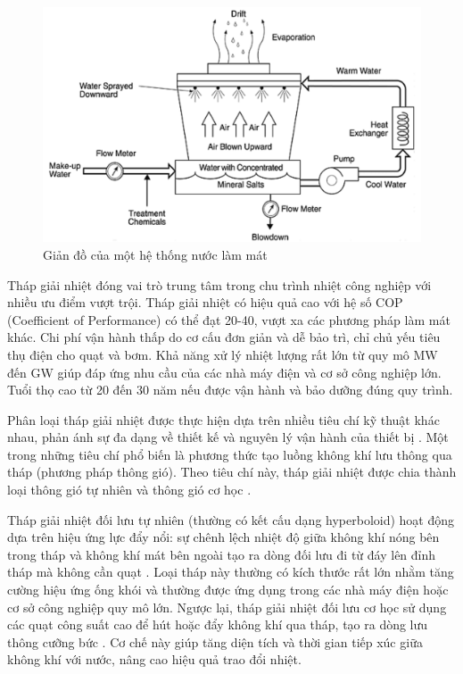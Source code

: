\documentclass[../main.tex]{subfiles}
\begin{document}
\begin{figure}[H]
    \centering
    \includegraphics[width=1\textwidth]{Hinhve/gian_do_lam_mat.png}
    \caption{Giản đồ của một hệ thống nước làm mát \cite{unep2006coolingtower_en}}
    \label{fig:gian_do_lam_mat}
\end{figure}

Tháp giải nhiệt đóng vai trò trung tâm trong chu trình nhiệt công nghiệp \cite{ashrae2020cooling} với nhiều ưu điểm vượt trội. Tháp giải nhiệt có hiệu quả cao với hệ số COP (Coefficient of Performance) có thể đạt 20-40, vượt xa các phương pháp làm mát khác. Chi phí vận hành thấp do cơ cấu đơn giản và dễ bảo trì, chỉ chủ yếu tiêu thụ điện cho quạt và bơm. Khả năng xử lý nhiệt lượng rất lớn từ quy mô MW đến GW giúp đáp ứng nhu cầu của các nhà máy điện và cơ sở công nghiệp lớn. Tuổi thọ cao từ 20 đến 30 năm nếu được vận hành và bảo dưỡng đúng quy trình.

Phân loại tháp giải nhiệt được thực hiện dựa trên nhiều tiêu chí kỹ thuật khác nhau, phản ánh sự đa dạng về thiết kế và nguyên lý vận hành của thiết bị \cite{cti_cooling_towers_2011}. Một trong những tiêu chí phổ biến là phương thức tạo luồng không khí lưu thông qua tháp (phương pháp thông gió). Theo tiêu chí này, tháp giải nhiệt được chia thành loại thông gió tự nhiên và thông gió cơ học \cite{cti_cooling_towers_2011}.

Tháp giải nhiệt đối lưu tự nhiên (thường có kết cấu dạng hyperboloid) hoạt động dựa trên hiệu ứng lực đẩy nổi: sự chênh lệch nhiệt độ giữa không khí nóng bên trong tháp và không khí mát bên ngoài tạo ra dòng đối lưu đi từ đáy lên đỉnh tháp mà không cần quạt \cite{patterson_natural_draft_cooling_2013}. Loại tháp này thường có kích thước rất lớn nhằm tăng cường hiệu ứng ống khói và thường được ứng dụng trong các nhà máy điện hoặc cơ sở công nghiệp quy mô lớn. Ngược lại, tháp giải nhiệt đối lưu cơ học sử dụng các quạt công suất cao để hút hoặc đẩy không khí qua tháp, tạo ra dòng lưu thông cưỡng bức \cite{johnson_mechanical_draft_2016}. Cơ chế này giúp tăng diện tích và thời gian tiếp xúc giữa không khí với nước, nâng cao hiệu quả trao đổi nhiệt.
\end{document}
